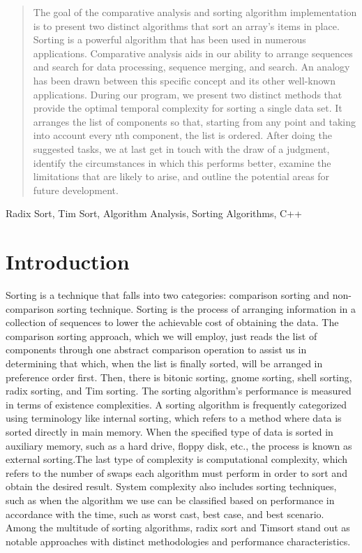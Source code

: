 \documentclass[conference]{IEEEtran}
\begin{document}
\begin{abstract}
    The goal of the comparative analysis and sorting algorithm implementation is to present two distinct algorithms that sort an array's items in place. Sorting is a powerful algorithm that has been used in numerous applications. Comparative analysis aids in our ability to arrange sequences and search for data processing, sequence merging, and search. An analogy has been drawn between this specific concept and its other well-known applications. During our program, we present two distinct methods that provide the optimal temporal complexity for sorting a single data set. It arranges the list of components so that, starting from any point and taking into account every nth component, the list is ordered. After doing the suggested tasks, we at last get in touch with the draw of a judgment, identify the circumstances in which this performs better, examine the limitations that are likely to arise, and outline the potential areas for future development.
\end{abstract}
\begin{IEEEkeywords}
    Radix Sort, Tim Sort, Algorithm Analysis, Sorting Algorithms, C++
\end{IEEEkeywords}
\section{Introduction}
Sorting is a technique that falls
 into two categories: comparison sorting
  and non-comparison sorting technique.
   Sorting is the process of arranging information in a collection of sequences to lower the achievable cost of obtaining the data. The comparison sorting approach, which we will employ, just reads the list of components through one abstract comparison operation to assist us in determining that which, when the list is finally sorted, will be arranged in preference order first. Then, there is bitonic sorting, gnome sorting, shell sorting, radix sorting, and Tim sorting. The sorting algorithm's performance is measured in terms of existence complexities. A sorting algorithm is frequently categorized using terminology like internal sorting, which refers to a method where data is sorted directly in main memory. When the specified type of data is sorted in auxiliary memory, such as a hard drive, floppy disk, etc., the process is known as external sorting.The last type of complexity is computational complexity, which refers to the number of swaps each algorithm must perform in order to sort and obtain the desired result. System complexity also includes sorting techniques, such as when the algorithm we use can be classified based on performance in accordance with the time, such as worst cast, best case, and best scenario. Among the multitude of sorting algorithms, radix sort and Timsort stand out as notable approaches with distinct methodologies and performance characteristics.
\end{document}
